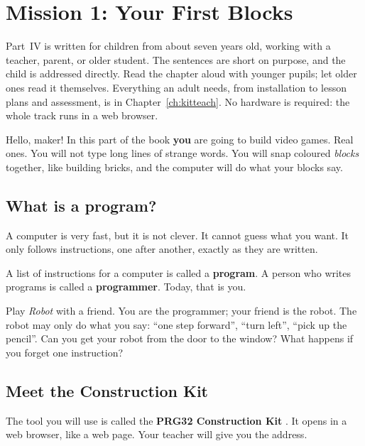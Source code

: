 \chapter{Mission 1: Your First Blocks}
\label{ch:kids1}

\begin{prgteacher}
Part~IV is written for children from about seven years old, working with a
teacher, parent, or older student. The sentences are short on purpose, and the
child is addressed directly. Read the chapter aloud with younger pupils; let
older ones read it themselves. Everything an adult needs, from installation to
lesson plans and assessment, is in Chapter~\ref{ch:kitteach}. No hardware is
required: the whole track runs in a web browser.
\end{prgteacher}

Hello, maker! In this part of the book \textbf{you} are going to build video
games. Real ones. You will not type long lines of strange words. You will snap
coloured \emph{blocks} together, like building bricks, and the computer will do
what your blocks say.

\section{What is a program?}

A computer is very fast, but it is not clever. It cannot guess what you want. It
only follows instructions, one after another, exactly as they are written.

A list of instructions for a computer is called a \textbf{program}. A person who
writes programs is called a \textbf{programmer}. Today, that is you.

\begin{prgtry}
Play \emph{Robot} with a friend. You are the programmer; your friend is the
robot. The robot may only do what you say: ``one step forward'', ``turn left'',
``pick up the pencil''. Can you get your robot from the door to the window? What
happens if you forget one instruction?
\end{prgtry}

\section{Meet the Construction Kit}

The tool you will use is called the \textbf{PRG32 Construction Kit}
\citep{prg32kit}. It opens in a web browser, like a web page. Your teacher will
give you the address.

